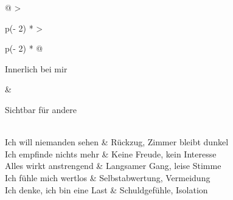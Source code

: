 \begin{longtable}[]{@{}
  >{\raggedright\arraybackslash}p{(\columnwidth - 2\tabcolsep) * }
  >{\raggedright\arraybackslash}p{(\columnwidth - 2\tabcolsep) * }@{}}
\toprule\noalign{}
\begin{minipage}[b]{\linewidth}\raggedright
Innerlich bei mir
\end{minipage} \& \begin{minipage}[b]{\linewidth}\raggedright
Sichtbar für andere
\end{minipage} \\
\midrule\noalign{}
\endhead
\bottomrule\noalign{}
\endlastfoot
Ich will niemanden sehen \& Rückzug, Zimmer bleibt dunkel \\
Ich empfinde nichts mehr \& Keine Freude, kein Interesse \\
Alles wirkt anstrengend \& Langsamer Gang, leise Stimme \\
Ich fühle mich wertlos \& Selbstabwertung, Vermeidung \\
Ich denke, ich bin eine Last \& Schuldgefühle, Isolation \\

\end{longtable}
